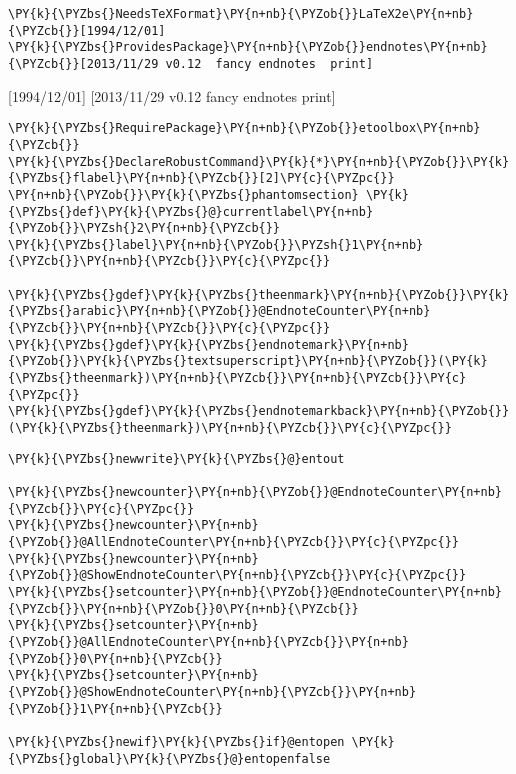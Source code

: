 \begin{Verbatim}[commandchars=\\\{\}]
\PY{k}{\PYZbs{}NeedsTeXFormat}\PY{n+nb}{\PYZob{}}LaTeX2e\PY{n+nb}{\PYZcb{}}[1994/12/01]
\PY{k}{\PYZbs{}ProvidesPackage}\PY{n+nb}{\PYZob{}}endnotes\PY{n+nb}{\PYZcb{}}[2013/11/29 v0.12  fancy endnotes  print]
\end{Verbatim}

[1994/12/01]
[2013/11/29 v0.12  fancy endnotes  print]

\begin{Verbatim}[commandchars=\\\{\}]
\PY{k}{\PYZbs{}RequirePackage}\PY{n+nb}{\PYZob{}}etoolbox\PY{n+nb}{\PYZcb{}}
\PY{k}{\PYZbs{}DeclareRobustCommand}\PY{k}{*}\PY{n+nb}{\PYZob{}}\PY{k}{\PYZbs{}flabel}\PY{n+nb}{\PYZcb{}}[2]\PY{c}{\PYZpc{}}
\PY{n+nb}{\PYZob{}}\PY{k}{\PYZbs{}phantomsection} \PY{k}{\PYZbs{}def}\PY{k}{\PYZbs{}@}currentlabel\PY{n+nb}{\PYZob{}}\PYZsh{}2\PY{n+nb}{\PYZcb{}}
\PY{k}{\PYZbs{}label}\PY{n+nb}{\PYZob{}}\PYZsh{}1\PY{n+nb}{\PYZcb{}}\PY{n+nb}{\PYZcb{}}\PY{c}{\PYZpc{}}

\PY{k}{\PYZbs{}gdef}\PY{k}{\PYZbs{}theenmark}\PY{n+nb}{\PYZob{}}\PY{k}{\PYZbs{}arabic}\PY{n+nb}{\PYZob{}}@EndnoteCounter\PY{n+nb}{\PYZcb{}}\PY{n+nb}{\PYZcb{}}\PY{c}{\PYZpc{}}
\PY{k}{\PYZbs{}gdef}\PY{k}{\PYZbs{}endnotemark}\PY{n+nb}{\PYZob{}}\PY{k}{\PYZbs{}textsuperscript}\PY{n+nb}{\PYZob{}}(\PY{k}{\PYZbs{}theenmark})\PY{n+nb}{\PYZcb{}}\PY{n+nb}{\PYZcb{}}\PY{c}{\PYZpc{}}
\PY{k}{\PYZbs{}gdef}\PY{k}{\PYZbs{}endnotemarkback}\PY{n+nb}{\PYZob{}}(\PY{k}{\PYZbs{}theenmark})\PY{n+nb}{\PYZcb{}}\PY{c}{\PYZpc{}}
\end{Verbatim}

\RequirePackage{etoolbox}
\DeclareRobustCommand*{\flabel}[2]%
{\phantomsection \def\@currentlabel{#2}
\label{#1}}%

\gdef\theenmark{\arabic{@EndnoteCounter}}%
\gdef\endnotemark{\textsuperscript{(\theenmark)}}%
\gdef\endnotemarkback{(\theenmark)}%

\begin{Verbatim}[commandchars=\\\{\}]
\PY{k}{\PYZbs{}newwrite}\PY{k}{\PYZbs{}@}entout

\PY{k}{\PYZbs{}newcounter}\PY{n+nb}{\PYZob{}}@EndnoteCounter\PY{n+nb}{\PYZcb{}}\PY{c}{\PYZpc{}}
\PY{k}{\PYZbs{}newcounter}\PY{n+nb}{\PYZob{}}@AllEndnoteCounter\PY{n+nb}{\PYZcb{}}\PY{c}{\PYZpc{}}
\PY{k}{\PYZbs{}newcounter}\PY{n+nb}{\PYZob{}}@ShowEndnoteCounter\PY{n+nb}{\PYZcb{}}\PY{c}{\PYZpc{}}
\PY{k}{\PYZbs{}setcounter}\PY{n+nb}{\PYZob{}}@EndnoteCounter\PY{n+nb}{\PYZcb{}}\PY{n+nb}{\PYZob{}}0\PY{n+nb}{\PYZcb{}}
\PY{k}{\PYZbs{}setcounter}\PY{n+nb}{\PYZob{}}@AllEndnoteCounter\PY{n+nb}{\PYZcb{}}\PY{n+nb}{\PYZob{}}0\PY{n+nb}{\PYZcb{}}
\PY{k}{\PYZbs{}setcounter}\PY{n+nb}{\PYZob{}}@ShowEndnoteCounter\PY{n+nb}{\PYZcb{}}\PY{n+nb}{\PYZob{}}1\PY{n+nb}{\PYZcb{}}

\PY{k}{\PYZbs{}newif}\PY{k}{\PYZbs{}if}@entopen \PY{k}{\PYZbs{}global}\PY{k}{\PYZbs{}@}entopenfalse
\end{Verbatim}

